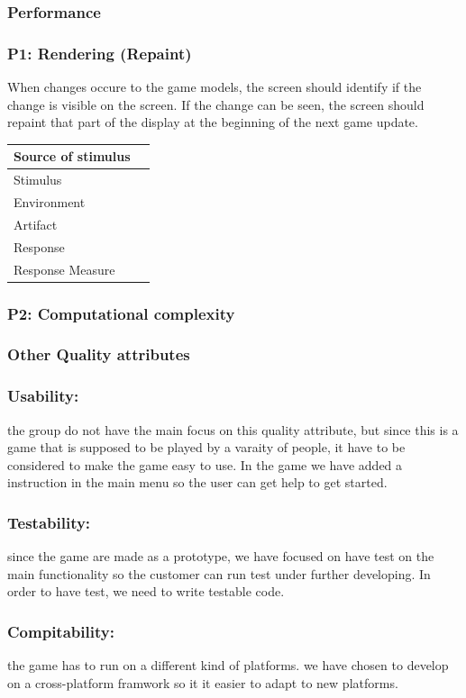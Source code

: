 \subsubsection{Performance}

\subsubsection*{P1: Rendering (Repaint)}
When changes occure to the game models, the screen should identify if the change 
is visible on the screen. If the change can be seen, the screen should repaint 
that part of the display at the beginning of the next game update.

\begin{tabular}{| l | l |}
	\hline
	Source of stimulus & \\ \hline
	Stimulus & \\ \hline
	Environment & \\ \hline
	Artifact & \\ \hline
	Response & \\ \hline
	Response Measure & \\ \hline

\end{tabular}

\subsubsection*{P2: Computational complexity}


\subsubsection{Other Quality attributes}
\subsubsection*{Usability: } the group do not have the main focus on this quality attribute, 
but since this is a game that is supposed to be played by a varaity of people, it
have to be considered to make the game easy to use. In the game we have added a 
instruction in the main menu so the user can get help to get started.

\subsubsection*{Testability: } since the game are made as a prototype, we have focused on have
test on the main functionality so the customer can run test under further developing.
In order to have test, we need to write testable code.

\subsubsection*{Compitability: } the game has to run on a different kind of platforms. we
have chosen to develop on a cross-platform framwork so it it easier to adapt to 
new platforms.
